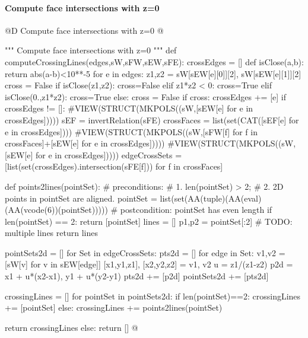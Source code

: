 \documentclass[11pt,oneside]{article}    %
\begin{document}
\paragraph{Compute face intersections with z=0}
@D Compute face intersections with z=0
@{""" Compute face intersections with z=0 """
def computeCrossingLines(edges,sW,sFW,sEW,sFE):
	crossEdges = []
	def isClose(a,b): return abs(a-b)<10**-5
	for e in edges:
		z1,z2 = sW[sEW[e][0]][2], sW[sEW[e][1]][2]
		cross = False
		if isClose(z1,z2):	cross=False
		elif z1*z2 < 0:		cross=True
		elif isClose(0.,z1*z2): cross=True
		else: cross = False
		if cross: crossEdges += [e]	
	if crossEdges != []:
		#VIEW(STRUCT(MKPOLS((sW,[sEW[e] for e in crossEdges]))))
		sEF = invertRelation(sFE)
		crossFaces = list(set(CAT([sEF[e] for e in crossEdges])))
		#VIEW(STRUCT(MKPOLS((sW,[sFW[f] for f in crossFaces]+[sEW[e] for e in crossEdges]))))
		#VIEW(STRUCT(MKPOLS((sW,[sEW[e] for e in crossEdges]))))
		edgeCrossSets = [list(set(crossEdges).intersection(sFE[f])) for f in crossFaces]		
		
		def points2lines(pointSet):
			#	preconditions:
			#	1.	len(pointSet) > 2;
			#	2.	2D points in pointSet are aligned.
			pointSet = list(set(AA(tuple)(AA(eval)(AA(vcode(6))(pointSet)))))
			# postcondition: pointSet has even length
			if len(pointSet) == 2: return [pointSet]
			lines = []
			p1,p2 = pointSet[:2]
			# TODO: multiple lines
			return lines

		pointSets2d = []
		for Set in edgeCrossSets:
			pts2d = []
			for edge in Set:
				v1,v2 = [sW[v] for v in sEW[edge]]
				[x1,y1,z1], [x2,y2,z2] = v1, v2
				u = z1/(z1-z2)
				p2d = x1 + u*(x2-x1), y1 + u*(y2-y1)
				pts2d += [p2d]
			pointSets2d += [pts2d]

		crossingLines = []
		for pointSet in pointSets2d:
			if len(pointSet)==2:
				crossingLines += [pointSet]
			else:
				crossingLines += points2lines(pointSet)

		return crossingLines
	else: return []
@}
\end{document}

